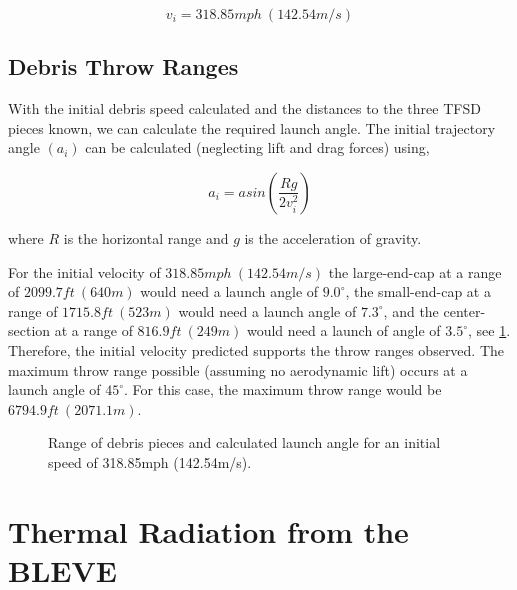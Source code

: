 \documentclass[10pt,parskip=half,
toc=sectionentrywithdots,
bibliography=totocnumbered,
captions=tableheading,numbers=noendperiod]{scrartcl}
\begin{document}
\begin{equation}v_i = 318.85 mph\:(142.54 m/s)\end{equation}

\hypertarget{debris-throw-ranges}{%
\subsection{Debris Throw Ranges}\label{debris-throw-ranges}}

With the initial debris speed calculated and the distances to the three
TFSD pieces known, we can calculate the required launch angle. The
initial trajectory angle \((a_i)\) can be calculated (neglecting lift
and drag forces) using,

\begin{equation}a_i = asin\left(\frac{Rg}{2v_i^2}\right)\end{equation}

where \(R\) is the horizontal range and \(g\) is the acceleration of
gravity.

For the initial velocity of \(318.85mph\:(142.54m/s)\) the large-end-cap
at a range of \(2099.7ft\:(640m)\) would need a launch angle of
\(9.0^\circ\), the small-end-cap at a range of \(1715.8ft\:(523m)\)
would need a launch angle of \(7.3^\circ\), and the center-section at a
range of \(816.9ft\:(249m)\) would need a launch of angle of
\(3.5^\circ\), see \cref{fig:fig_launch_angle}. Therefore, the initial
velocity predicted supports the throw ranges observed. The maximum throw
range possible (assuming no aerodynamic lift) occurs at a launch angle
of \(45^{\circ}\). For this case, the maximum throw range would be
\(6794.9ft\:(2071.1m)\).

\begin{figure}[H]\begin{center}\end{center}\caption{Range of debris pieces and calculated launch angle for an initial speed
of 318.85mph (142.54m/s).}\label{fig:fig_launch_angle}\end{figure}

\hypertarget{thermal-radiation-from-the-bleve}{%
\section{Thermal Radiation from the
BLEVE}\label{thermal-radiation-from-the-bleve}}
\end{document}
